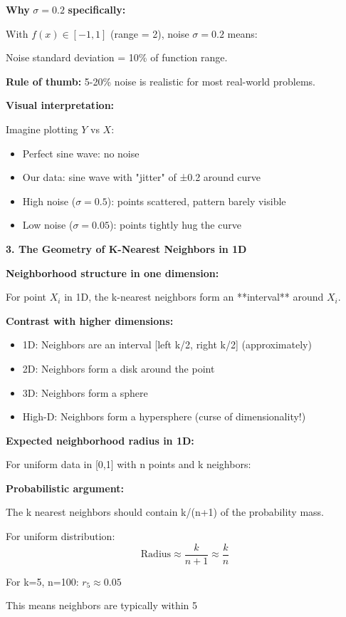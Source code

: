 \documentclass[12pt]{article}
\begin{document}
\begin{explanation}
\textbf{Why} $\sigma = 0.2$ \textbf{specifically:}

With $f(x) \in [-1,1]$ (range = 2), noise $\sigma = 0.2$ means:

Noise standard deviation = 10\% of function range.

\textbf{Rule of thumb:} 5-20\% noise is realistic for most real-world problems.

\textbf{Visual interpretation:}

Imagine plotting $Y$ vs $X$:
\begin{itemize}
    \item Perfect sine wave: no noise
    \item Our data: sine wave with "jitter" of ±0.2 around curve
    \item High noise ($\sigma=0.5$): points scattered, pattern barely visible
    \item Low noise ($\sigma=0.05$): points tightly hug the curve
\end{itemize}

\textbf{3. The Geometry of K-Nearest Neighbors in 1D}

\textbf{Neighborhood structure in one dimension:}

For point $X_i$ in 1D, the k-nearest neighbors form an **interval** around $X_i$.

\textbf{Contrast with higher dimensions:}

\begin{itemize}
    \item 1D: Neighbors are an interval [left k/2, right k/2] (approximately)
    \item 2D: Neighbors form a disk around the point
    \item 3D: Neighbors form a sphere
    \item High-D: Neighbors form a hypersphere (curse of dimensionality!)
\end{itemize}

\textbf{Expected neighborhood radius in 1D:}

For uniform data in [0,1] with n points and k neighbors:

\textbf{Probabilistic argument:}

The k nearest neighbors should contain k/(n+1) of the probability mass.

For uniform distribution:
\[
\text{Radius} \approx \frac{k}{n+1} \approx \frac{k}{n}
\]

For k=5, n=100: $r_5 \approx 0.05$

This means neighbors are typically within 5%


\end{explanation}
\end{document}
